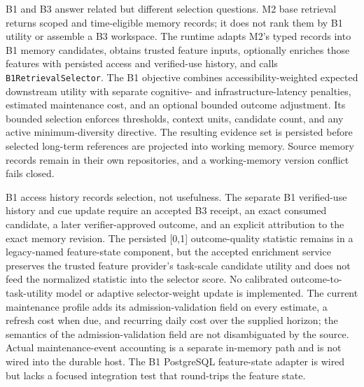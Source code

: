 \begin{chapterrecap}
B1 and B3 answer related but different selection questions. M2 base retrieval returns scoped and time-eligible memory records; it does not rank them by B1 utility or assemble a B3 workspace. The runtime adapts M2's typed records into B1 memory candidates, obtains trusted feature inputs, optionally enriches those features with persisted access and verified-use history, and calls \texttt{B1RetrievalSelector}. The B1 objective combines accessibility-weighted expected downstream utility with separate cognitive- and infrastructure-latency penalties, estimated maintenance cost, and an optional bounded outcome adjustment. Its bounded selection enforces thresholds, context units, candidate count, and any active minimum-diversity directive. The resulting evidence set is persisted before selected long-term references are projected into working memory. Source memory records remain in their own repositories, and a working-memory version conflict fails closed.

B1 access history records selection, not usefulness. The separate B1 verified-use history and cue update require an accepted B3 receipt, an exact consumed candidate, a later verifier-approved outcome, and an explicit attribution to the exact memory revision. The persisted [0,1] outcome-quality statistic remains in a legacy-named feature-state component, but the accepted enrichment service preserves the trusted feature provider's task-scale candidate utility and does not feed the normalized statistic into the selector score. No calibrated outcome-to-task-utility model or adaptive selector-weight update is implemented. The current maintenance profile adds its admission-validation field on every estimate, a refresh cost when due, and recurring daily cost over the supplied horizon; the semantics of the admission-validation field are not disambiguated by the source. Actual maintenance-event accounting is a separate in-memory path and is not wired into the durable host. The B1 PostgreSQL feature-state adapter is wired but lacks a focused integration test that round-trips the feature state.


\end{chapterrecap}

